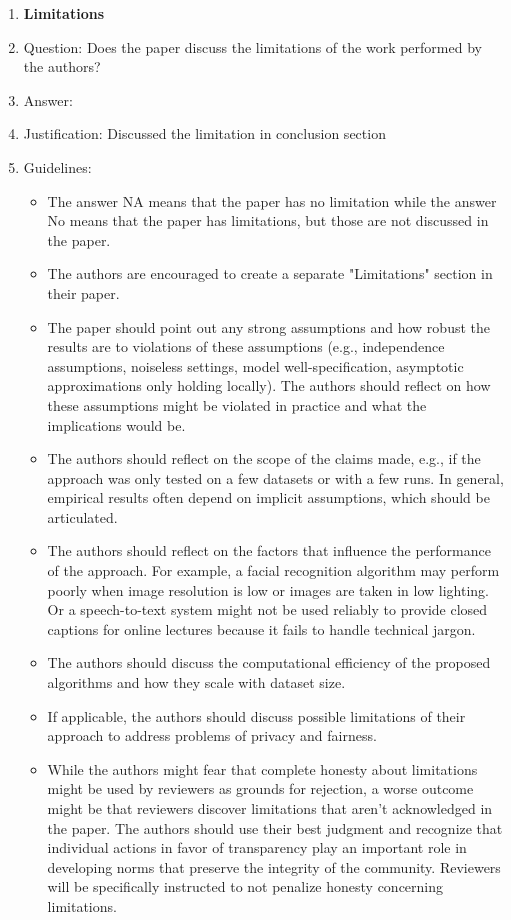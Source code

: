 \documentclass{article}
\begin{document}
\begin{enumerate}
\item {\bf Limitations}
    \item[] Question: Does the paper discuss the limitations of the work performed by the authors?
    \item[] Answer: \answerYes{} %
    \item[] Justification: \justification Discussed the limitation in conclusion section{}
    \item[] Guidelines:
    \begin{itemize}
        \item The answer NA means that the paper has no limitation while the answer No means that the paper has limitations, but those are not discussed in the paper. 
        \item The authors are encouraged to create a separate "Limitations" section in their paper.
        \item The paper should point out any strong assumptions and how robust the results are to violations of these assumptions (e.g., independence assumptions, noiseless settings, model well-specification, asymptotic approximations only holding locally). The authors should reflect on how these assumptions might be violated in practice and what the implications would be.
        \item The authors should reflect on the scope of the claims made, e.g., if the approach was only tested on a few datasets or with a few runs. In general, empirical results often depend on implicit assumptions, which should be articulated.
        \item The authors should reflect on the factors that influence the performance of the approach. For example, a facial recognition algorithm may perform poorly when image resolution is low or images are taken in low lighting. Or a speech-to-text system might not be used reliably to provide closed captions for online lectures because it fails to handle technical jargon.
        \item The authors should discuss the computational efficiency of the proposed algorithms and how they scale with dataset size.
        \item If applicable, the authors should discuss possible limitations of their approach to address problems of privacy and fairness.
        \item While the authors might fear that complete honesty about limitations might be used by reviewers as grounds for rejection, a worse outcome might be that reviewers discover limitations that aren't acknowledged in the paper. The authors should use their best judgment and recognize that individual actions in favor of transparency play an important role in developing norms that preserve the integrity of the community. Reviewers will be specifically instructed to not penalize honesty concerning limitations.
    \end{itemize}


\end{enumerate}
\end{document}
